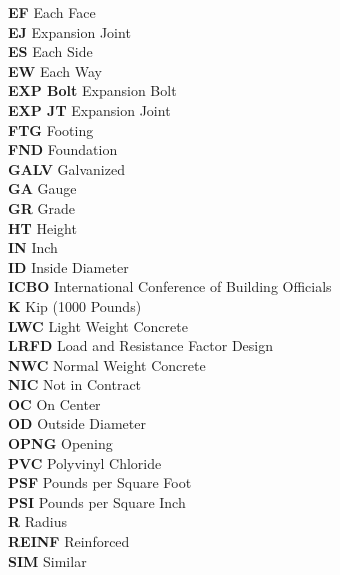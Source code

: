 \documentclass[12pt,notitle,letterpaper]{report}
\begin{document}
\begin{tabbing}
    \indent\textbf{EF}       \>  {Each Face}\\
    \indent\textbf{EJ}       \>  {Expansion Joint}\\
    \indent\textbf{ES}       \>  {Each Side}\\
    \indent\textbf{EW}       \>  {Each Way}\\
    \indent\textbf{EXP Bolt} \>  {Expansion Bolt}\\
    \indent\textbf{EXP JT}   \>  {Expansion Joint}\\
    \indent\textbf{FTG}      \>  {Footing}\\
    \indent\textbf{FND}      \>  {Foundation}\\
    \indent\textbf{GALV}     \>  {Galvanized}\\
    \indent\textbf{GA}       \>  {Gauge}\\
    \indent\textbf{GR}       \>  {Grade}\\
    \indent\textbf{HT}       \>  {Height}\\
    \indent\textbf{IN}       \>  {Inch}\\
    \indent\textbf{ID}       \>  {Inside Diameter}\\
    \indent\textbf{ICBO}     \>  {International Conference of Building Officials}\\
    \indent\textbf{K}        \>  {Kip (1000 Pounds)}\\
    \indent\textbf{LWC}      \>  {Light Weight Concrete}\\
    \indent\textbf{LRFD}     \>  {Load and Resistance Factor Design}\\
    \indent\textbf{NWC}      \>  {Normal Weight Concrete}\\
    \indent\textbf{NIC}      \>  {Not in Contract}\\
    \indent\textbf{OC}       \>  {On Center}\\
    \indent\textbf{OD}       \>  {Outside Diameter}\\
    \indent\textbf{OPNG}     \>  {Opening}\\
    \indent\textbf{PVC}      \>  {Polyvinyl Chloride}\\
    \indent\textbf{PSF}      \>  {Pounds per Square Foot}\\
    \indent\textbf{PSI}      \>  {Pounds per Square Inch}\\
    \indent\textbf{R}        \>  {Radius}\\
    \indent\textbf{REINF}    \>  {Reinforced}\\
    \indent\textbf{SIM}      \>  {Similar}\\

\end{tabbing}
\end{document}
